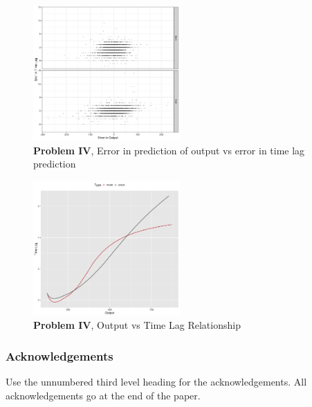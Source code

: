 \documentclass[twoside]{article}
\begin{document}
\begin{figure}[h]
\vspace{.3in}
\centerline{\includegraphics[width=0.5\textwidth]{figures/exp4_scatter_errors_test.png}}
\vspace{.3in}
\caption{\textbf{Problem IV}, Error in prediction of output vs error in time lag prediction}
\end{figure}

\begin{figure}[h]
\vspace{.3in}
\centerline{\includegraphics[width=0.5\textwidth]{figures/exp4_predictive_curves.png}}
\vspace{.3in}
\caption{\textbf{Problem IV}, Output vs Time Lag Relationship}
\end{figure}


\subsubsection*{Acknowledgements}

Use the unnumbered third level heading for the acknowledgements.  All
acknowledgements go at the end of the paper.


\end{document}
